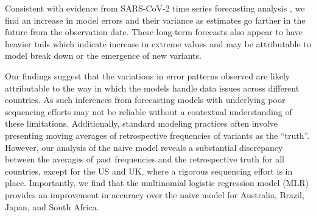 \documentclass[11pt,oneside,letterpaper]{article}
\begin{document}
Consistent with evidence from SARS-CoV-2 time series forecasting analysis \cite{cramer2022unitedforecastinghub}, we find an increase in model errors and their variance as estimates go farther in the future from the observation date.
These long-term forecasts also appear to have heavier tails which indicate increase in extreme values and may be attributable to model break down or the emergence of new variants.

%



Our findings suggest that the variations in error patterns observed are likely attributable to the way in which the models handle data issues across different countries.
As such inferences from forecasting models with underlying poor sequencing efforts may not be reliable without a contextual understanding of these limitations.
Additionally, standard modeling practices often involve presenting moving averages of retrospective frequencies of variants as the ``truth''.
However, our analysis of the naive model reveals a substantial discrepancy between the averages of past frequencies and the retrospective truth for all countries, except for the US and UK, where a rigorous sequencing effort is in place.
Importantly, we find that the multinomial logistic regression model (MLR) provides an improvement in accuracy over the naive model for Australia, Brazil, Japan, and South Africa.

\end{document}
